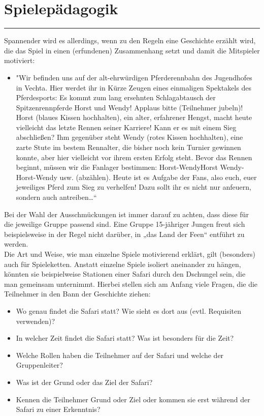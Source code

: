 \section*{Spielepädagogik}
\par\noindent\rule{\textwidth}{0.4pt} \newline \newline
Spannender wird es allerdings, wenn zu den Regeln eine Geschichte erzählt wird, die das Spiel in 
einen (erfundenen) Zusammenhang setzt und damit die Mitspieler motiviert:
\begin{itemize}
    \item[]"Wir befinden uns auf der alt-ehrwürdigen Pferderennbahn des Jugendhofes in 
Vechta. Hier werdet ihr in Kürze Zeugen eines einmaligen Spektakels des 
Pferdesports: Es kommt zum lang ersehnten Schlagabtausch der Spitzenrennpferde 
Horst und Wendy! Applaus bitte (Teilnehmer jubeln)! Horst (blaues Kissen 
hochhalten), ein alter, erfahrener Hengst, macht heute vielleicht das letzte Rennen 
seiner Karriere! Kann er es mit einem Sieg abschließen? Ihm gegenüber steht Wendy 
(rotes Kissen hochhalten), eine zarte Stute im bestem Rennalter, die bisher noch kein 
Turnier gewinnen konnte, aber hier vielleicht vor ihrem ersten Erfolg steht. Bevor 
das Rennen beginnt, müssen wir die Fanlager bestimmen: Horst-WendyHorst Wendy-Horst-Wendy usw. (abzählen). Heute ist es Aufgabe der Fans, also euch, euer 
jeweiliges Pferd zum Sieg zu verhelfen! Dazu sollt ihr es nicht nur anfeuern, sondern 
auch antreiben…“
\end{itemize}

Bei der Wahl der Ausschmückungen ist immer darauf zu achten, dass diese für die jeweilige 
Gruppe passend sind. Eine Gruppe 15-jähriger Jungen freut sich beispielsweise in der Regel nicht 
darüber, in „das Land der Feen“ entführt zu werden. \\

Die Art und Weise, wie man einzelne Spiele motivierend erklärt, gilt (besonders) auch für 
Spieleketten. Anstatt einzelne Spiele isoliert aneinander zu hängen, könnten sie beispielweise 
Stationen einer Safari durch den Dschungel sein, die man gemeinsam unternimmt. Hierbei stellen 
sich am Anfang viele Fragen, die die Teilnehmer in den Bann der Geschichte ziehen:

\begin{itemize}
    \item Wo genau findet die Safari statt? Wie sieht es dort aus (evtl. Requisiten verwenden)? 
    \item In welcher Zeit findet die Safari statt? Was ist besonders für die Zeit? 
    \item Welche Rollen haben die Teilnehmer auf der Safari und welche der Gruppenleiter?
    \item Was ist der Grund oder das Ziel der Safari? 
    \item Kennen die Teilnehmer Grund oder Ziel oder kommen sie erst während der Safari zu einer Erkenntnis?
\end{itemize}

